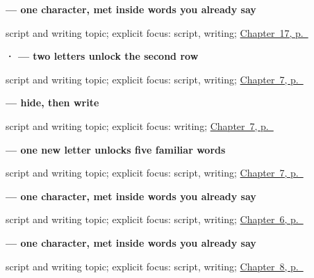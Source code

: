 \noindent\begin{minipage}[t]{\linewidth}
\raggedright
\textbf{ — one character, met inside words you already say}\par
\footnotesize script and writing topic; explicit focus: script, writing; \hyperref[ch:ml-noon-and-midnight]{Chapter~17, p.~\pageref*{ch:ml-noon-and-midnight}}
\end{minipage}\par\smallskip

\noindent\begin{minipage}[t]{\linewidth}
\raggedright
\textbf{ ·  — two letters unlock the second row}\par
\footnotesize script and writing topic; explicit focus: script, writing; \hyperref[ch:ml-numbers-one-to-ten]{Chapter~7, p.~\pageref*{ch:ml-numbers-one-to-ten}}
\end{minipage}\par\smallskip

\noindent\begin{minipage}[t]{\linewidth}
\raggedright
\textbf{ — hide, then write}\par
\footnotesize script and writing topic; explicit focus: writing; \hyperref[ch:ml-numbers-one-to-ten]{Chapter~7, p.~\pageref*{ch:ml-numbers-one-to-ten}}
\end{minipage}\par\smallskip

\noindent\begin{minipage}[t]{\linewidth}
\raggedright
\textbf{ — one new letter unlocks five familiar words}\par
\footnotesize script and writing topic; explicit focus: script, writing; \hyperref[ch:ml-numbers-one-to-ten]{Chapter~7, p.~\pageref*{ch:ml-numbers-one-to-ten}}
\end{minipage}\par\smallskip

\noindent\begin{minipage}[t]{\linewidth}
\raggedright
\textbf{ — one character, met inside words you already say}\par
\footnotesize script and writing topic; explicit focus: script, writing; \hyperref[ch:ml-dative-case]{Chapter~6, p.~\pageref*{ch:ml-dative-case}}
\end{minipage}\par\smallskip

\noindent\begin{minipage}[t]{\linewidth}
\raggedright
\textbf{ — one character, met inside words you already say}\par
\footnotesize script and writing topic; explicit focus: script, writing; \hyperref[ch:ml-please]{Chapter~8, p.~\pageref*{ch:ml-please}}
\end{minipage}\par\smallskip

